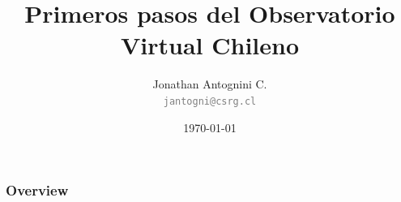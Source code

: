 \documentclass{beamer}
\title[Primeros Pasos Chivo]{Primeros pasos del Observatorio Virtual Chileno}
\author{Jonathan Antognini C. \\
        \small{\textcolor{gray}{\texttt{jantogni@csrg.cl}}}}
\institute[CSRG-UTFSM]{
Computer Systems Research Group,\\
Universidad Técnica Fedrico Santa María
}
\date{\today}
\begin{document}
\begin{frame}[t,plain]
\titlepage
\end{frame}



\begin{frame}
	\frametitle{Overview}
	\tableofcontents
\end{frame}





\begin{frame}[t,plain]
\titlepage
\end{frame}
\end{document}
